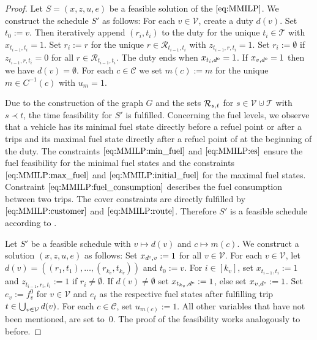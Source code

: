 \begin{proof}

Let ${S=(x,z,u,e)}$ be a feasible solution of the $\eqref{eq:MMILP}$. We construct the schedule $S'$ as follows: For each ${v\in\mathcal{V}}$, create a duty $d(v)$. Set ${t_0:=v}$. Then iteratively append $\left(r_i,t_i\right)$ to the duty for the unique ${t_i\in\mathcal{T}}$ with ${x_{t_{i-1},t_i}=1}$. Set ${r_i:=r}$ for the unique ${r\in\mathcal{R}_{t_{i-1},t_i}}$ with ${z_{t_{i-1},r,t_i}=1}$. Set ${r_i:=\emptyset}$ if ${z_{t_{i-1},r,t_i}=0}$ for all ${r\in\mathcal{R}_{t_{i-1},t_i}}$. The duty ends when ${x_{t_i,d^{\operatorname{e}}}=1}$. If ${x_{v,d^{\operatorname{e}}}=1}$ then we have ${d(v)=\emptyset}$. For each ${c\in\mathcal{C}}$ we set ${m(c):=m}$ for the unique ${m\in C^{-1}(c)}$ with ${u_m=1}$.

Due to the construction of the graph $G$ and the sets $\mathcal{R}_{s,t}$ for ${s\in\mathcal{V}\cupdot\mathcal{T}}$ with $s\prec t$, the time feasibility for $S'$ is fulfilled. Concerning the fuel levels, we observe that a vehicle has its minimal fuel state directly before a refuel point or after a trips and its maximal fuel state directly after a refuel point of at the beginning of the duty. The constraints $\eqref{eq:MMILP:min_fuel}$ and $\eqref{eq:MMILP:es}$ ensure the fuel feasibility for the minimal fuel states and the constraints $\eqref{eq:MMILP:max_fuel}$ and $\eqref{eq:MMILP:initial_fuel}$ for the maximal fuel states. Constraint $\eqref{eq:MMILP:fuel_consumption}$ describes the fuel consumption between two trips. The cover constraints are directly fulfilled by $\eqref{eq:MMILP:customer}$ and $\eqref{eq:MMILP:route}$. Therefore $S'$ is a feasible schedule according to .

Let $S'$ be a feasible schedule with $v\mapsto d(v)$ and $c\mapsto m(c)$. We construct a solution $(x,z,u,e)$ as follows: Set ${x_{d^{\operatorname{s}},v}:=1}$ for all ${v\in\mathcal{V}}$. For each ${v\in\mathcal{V}}$, let \linebreak
${d(v)=\left(\left(r_1,t_1\right),\dots,\left(r_{k_v},t_{k_v}\right)\right)}$ and ${t_0:= v}$. For ${i\in\left[k_v\right]}$, set ${x_{t_{i-1},t_i}:=1}$ and \linebreak
${z_{t_{i-1},r_i,t_i}:=1}$ if ${r_i\neq\emptyset}$. If ${d(v)\neq\emptyset}$ set ${x_{t_{k_v},d^{\operatorname{e}}}:=1}$, else set ${x_{v,d^{\operatorname{e}}}:=1}$. Set ${e_v:=f^0_v}$ for ${v\in\mathcal{V}}$ and $e_t$ as the respective fuel states after fulfilling trip ${t\in\bigcup_{v\in\mathcal{V}} d(v)}$. For each ${c\in\mathcal{C}}$, set ${u_{m(c)}:=1}$. All other variables that have not been mentioned, are set to~$0$. The proof of the feasibility works analogously to before.


\end{proof}
